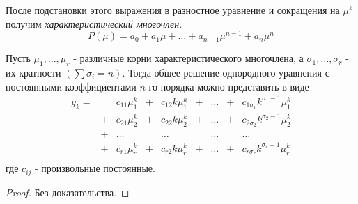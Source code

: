 После подстановки этого выражения в разностное уравнение
и сокращения на $\mu^k$ получим \textit{характеристический многочлен}.
\[P(\mu)=a_0+a_1\mu+\ldots+a_{n-1}\mu^{n-1}+a_{n}\mu^{n}\]
\begin{statement}
  Пусть $\mu_1,\ldots,\mu_r$ - различные корни характеристического
  многочлена, а $\sigma_1,\ldots,\sigma_r$ - их кратности $\left(\sum\sigma_i=n\right)$.
  Тогда общее решение однородного уравнения с постоянными
  коэффициентами $n$-го порядка можно представить в виде
  \[
    \begin{array}{ccccccccc}
      y_k = &   & c_{11}\mu_1^k & + & c_{12}k\mu_1^k & + & \ldots & + & c_{1\sigma_1}k^{\sigma_1-1}\mu_1^k \\
            & + & c_{21}\mu_2^k & + & c_{22}k\mu_2^k & + & \ldots & + & c_{2\sigma_2}k^{\sigma_2-1}\mu_2^k \\
            & + & \ldots        &   & \ldots         &   & \ldots &   & \ldots                             \\
            & + & c_{r1}\mu_r^k & + & c_{r2}k\mu_r^k & + & \ldots & + & c_{r\sigma_r}k^{\sigma_r-1}\mu_r^k \\
    \end{array}
  \]
  где $c_{ij}$ - произвольные постоянные.
\end{statement}
\begin{proof}
  Без доказательства.
\end{proof}
